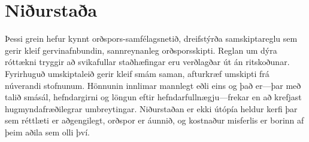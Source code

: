 \documentclass[11pt,a4paper,twocolumn]{article}
\begin{document}
\section{Niðurstaða}

Þessi grein hefur kynnt orðspors-samfélagsnetið, dreifstýrða samskiptareglu sem gerir kleif gervinafnbundin, sannreynanleg orðsporsskipti. Reglan um dýra róttækni tryggir að svikafullar staðhæfingar eru verðlagðar út án ritskoðunar. Fyrirhuguð umskiptaleið gerir kleif smám saman, afturkræf umskipti frá núverandi stofnunum. Hönnunin innlimar mannlegt eðli eins og það er---þar með talið smásál, hefndargirni og löngun eftir hefndarfullnægju---frekar en að krefjast hugmyndafræðilegrar umbreytingar. Niðurstaðan er ekki útópía heldur kerfi þar sem réttlæti er aðgengilegt, orðspor er áunnið, og kostnaður misferlis er borinn af þeim aðila sem olli því.


\end{document}
